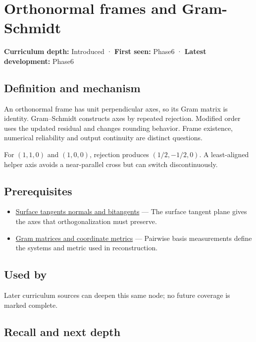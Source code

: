 \hypertarget{appendix-c39f1ed34271}{}
\section{Orthonormal frames and Gram-Schmidt}\label{appendix-c39f1ed34271-orthonormal-frames-and-gram-schmidt}

\textbf{Curriculum depth:} Introduced · \textbf{First seen:} Phase6 · \textbf{Latest development:} Phase6

\subsection{Definition and mechanism}\label{appendix-c39f1ed34271-definition-and-mechanism}

An orthonormal frame has unit perpendicular axes, so its Gram matrix is identity. Gram--Schmidt constructs axes by repeated rejection. Modified order uses the updated residual and changes rounding behavior. Frame existence, numerical reliability and output continuity are distinct questions.

For \((1,1,0)\) and \((1,0,0)\), rejection produces \((1/2,-1/2,0)\). A least-aligned helper axis avoids a near-parallel cross but can switch discontinuously.

\subsection{Prerequisites}\label{appendix-c39f1ed34271-prerequisites}

\begin{itemize}
\tightlist
\item
  \hyperref[appendix-e31893dec985]{Surface tangents normals and bitangents} --- The surface tangent plane gives the axes that orthogonalization must preserve.
\item
  \hyperref[appendix-3b863809f82a]{Gram matrices and coordinate metrics} --- Pairwise basis measurements define the systems and metric used in reconstruction.
\end{itemize}

\subsection{Used by}\label{appendix-c39f1ed34271-used-by}

Later curriculum sources can deepen this same node; no future coverage is marked complete.

\subsection{Recall and next depth}\label{appendix-c39f1ed34271-recall-and-next-depth}

